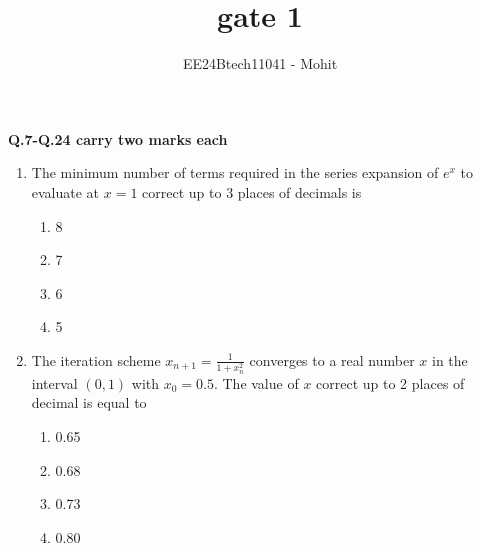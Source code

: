 \documentclass[journal,12pt,onecolumn]{IEEEtran}
\theoremstyle{remark}
\begin{document}
\title{gate 1}
\author{EE24Btech11041 - Mohit}
\maketitle
\renewcommand{\thefigure}{\theenumi}
\renewcommand{\thetable}{\theenumi}
\textbf{Q.7-Q.24 carry two marks each}

\begin{enumerate}
    \item The minimum number of terms required in the series expansion of $e^x$ to evaluate at $x = 1$ correct up to 3 places of decimals is
    \begin{multicols}{4}
    \begin{enumerate}
        \item 8
        \item 7
        \item 6
        \item 5
    \end{enumerate}
\end{multicols}
    \item The iteration scheme $x_{n+1} = \frac{1}{1 + x_n^2}$ converges to a real number $x$ in the interval $(0, 1)$ with $x_0 = 0.5$. The value of $x$ correct up to 2 places of decimal is equal to
 \begin{multicols}{4}
    \begin{enumerate}
        \item 0.65
        \item 0.68
        \item 0.73
        \item 0.80
    \end{enumerate}
    \end{multicols}


\end{enumerate}
\end{document}
